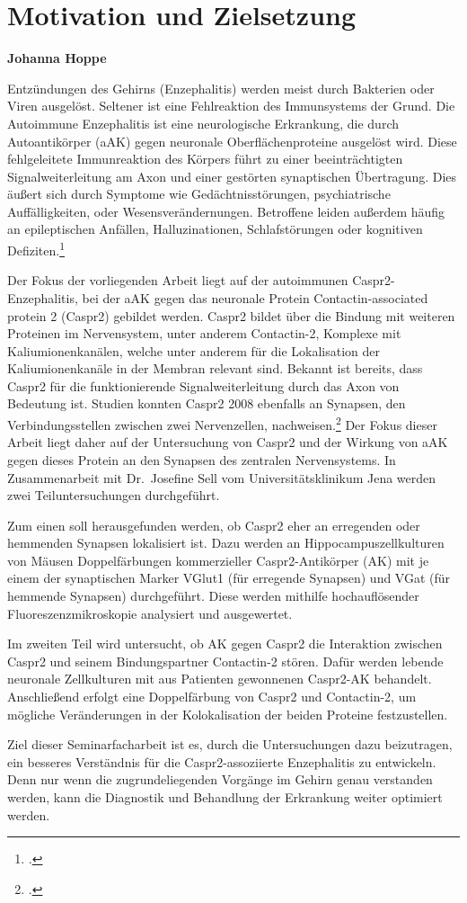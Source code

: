 \chapter{Motivation und Zielsetzung}
\textbf{Johanna Hoppe}


Entzündungen des Gehirns (Enzephalitis) werden meist durch Bakterien
oder Viren ausgelöst. Seltener ist eine Fehlreaktion des Immunsystems
der Grund. Die Autoimmune Enzephalitis ist eine neurologische Erkrankung, die durch
Autoantikörper (aAK) gegen neuronale Oberflächenproteine ausgelöst wird. Diese
fehlgeleitete Immunreaktion des Körpers führt zu einer beeinträchtigten
Signalweiterleitung am Axon und einer gestörten synaptischen
Übertragung. Dies äußert sich durch Symptome wie Gedächtnisstörungen, psychiatrische Auffälligkeiten, oder Wesensverändernungen. Betroffene leiden außerdem häufig
an epileptischen Anfällen, Halluzinationen, Schlafstörungen oder kognitiven
Defiziten.\footcite{VanSonderenNatRev2016}

Der Fokus der vorliegenden Arbeit liegt auf der autoimmunen
Caspr2-Enzephalitis, bei der aAK gegen das neuronale Protein
Contactin-associated protein 2 (Caspr2) gebildet werden. Caspr2 bildet über die Bindung mit weiteren Proteinen im Nervensystem, unter anderem Contactin-2, Komplexe mit Kaliumionenkanälen, welche unter anderem für
die Lokalisation der Kaliumionenkanäle in der Membran relevant sind. Bekannt ist
bereits, dass Caspr2 für die funktionierende Signalweiterleitung durch
das Axon von Bedeutung ist. Studien konnten Caspr2 2008 ebenfalls an Synapsen, den Verbindungsstellen zwischen zwei Nervenzellen, nachweisen.\footcite{Bakkaloglu2008} Der Fokus dieser Arbeit liegt daher auf der
Untersuchung von Caspr2 und der Wirkung von aAK gegen
dieses Protein an den Synapsen des zentralen Nervensystems. In
Zusammenarbeit mit Dr.~Josefine Sell vom Universitätsklinikum Jena
werden zwei Teiluntersuchungen
durchgeführt.

Zum einen soll herausgefunden werden, ob Caspr2 eher an erregenden oder
hemmenden Synapsen lokalisiert ist. Dazu werden an
Hippocampuszellkulturen von Mäusen Doppelfärbungen kommerzieller
Caspr2-Antikörper (AK) mit je einem der synaptischen Marker VGlut1 (für
erregende Synapsen) und VGat (für hemmende Synapsen)
durchgeführt. Diese werden mithilfe hochauflösender
Fluoreszenzmikroskopie analysiert und ausgewertet.

Im zweiten Teil wird untersucht, ob AK gegen Caspr2 die
Interaktion zwischen Caspr2 und seinem Bindungspartner Contactin-2
stören. Dafür werden lebende neuronale Zellkulturen mit aus Patienten gewonnenen 
Caspr2-AK behandelt. Anschließend erfolgt eine Doppelfärbung
von Caspr2 und Contactin-2, um mögliche Veränderungen in der
Kolokalisation der beiden Proteine festzustellen.

Ziel dieser Seminarfacharbeit ist es, durch die Untersuchungen dazu
beizutragen, ein besseres Verständnis für die Caspr2-assoziierte
Enzephalitis zu entwickeln. Denn nur wenn die zugrundeliegenden Vorgänge
im Gehirn genau verstanden werden, kann die Diagnostik und Behandlung
der Erkrankung weiter optimiert werden.